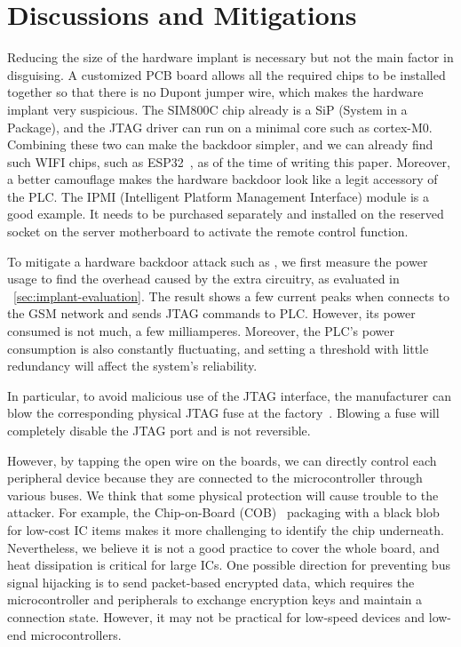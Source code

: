 \section{Discussions and Mitigations}
\label{sec:implant-discussion}

Reducing the size of the hardware implant is necessary but not the main factor in disguising. A customized PCB board allows all the required chips to be installed together so that there is no Dupont jumper wire, which makes the hardware implant very suspicious. The SIM800C chip already is a SiP (System in a Package), and the JTAG driver can run on a minimal core such as cortex-M0. Combining these two can make the backdoor simpler, and we can already find such WIFI chips, such as ESP32~\cite{pravalika2019internet}, as of the time of writing this paper. Moreover, a better camouflage makes the hardware backdoor look like a legit accessory of the PLC. The IPMI (Intelligent Platform Management Interface) module is a good example. It needs to be purchased separately and installed on the reserved socket on the server motherboard to activate the remote control function.

To mitigate a hardware backdoor attack such as \name, we first measure the power usage to find the overhead caused by the extra circuitry, as evaluated in ~\autoref{sec:implant-evaluation}. The result shows a few current peaks when \name connects to the GSM network and sends JTAG commands to PLC. However, its power consumed is not much, a few milliamperes. Moreover, the PLC's power consumption is also constantly fluctuating, and setting a threshold with little redundancy will affect the system's reliability.

In particular, to avoid malicious use of the JTAG interface, the manufacturer can blow the corresponding physical JTAG fuse at the factory~\cite{rosenfeld2010attacks, buskey2006protected}. Blowing a fuse will completely disable the JTAG port and is not reversible.

However, by tapping the open wire on the boards, we can directly control each peripheral device because they are connected to the microcontroller through various buses. We think that some physical protection will cause trouble to the attacker. For example, the Chip-on-Board (COB)~\cite{lau1994chip} packaging with a black blob for low-cost IC items makes it more challenging to identify the chip underneath. Nevertheless, we believe it is not a good practice to cover the whole board, and heat dissipation is critical for large ICs. One possible direction for preventing bus signal hijacking is to send packet-based encrypted data, which requires the microcontroller and peripherals to exchange encryption keys and maintain a connection state. However, it may not be practical for low-speed devices and low-end microcontrollers.

